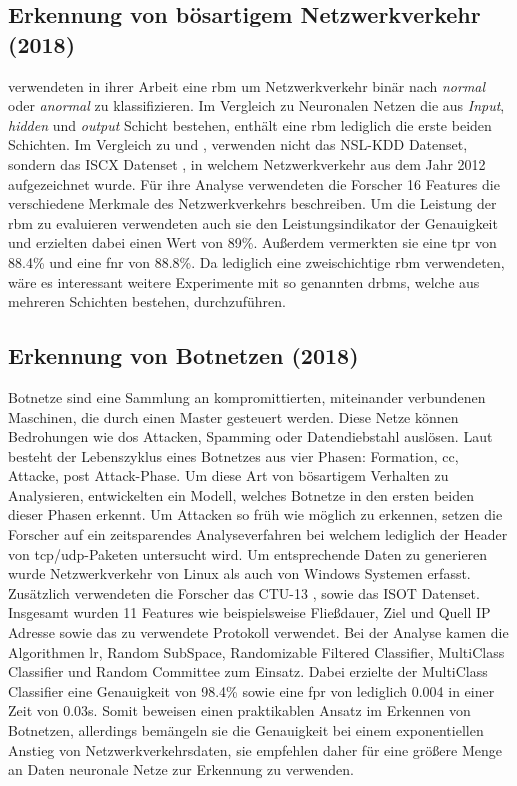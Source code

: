 \documentclass[
    12pt, %
    DIV10,
    ngerman, %
    a4paper, %
    oneside, %
    titlepage, %
    parskip=half, %
    headings=normal, %
    listof=totoc, %
    bibliography=totoc, %
    index=totoc, %
    captions=tableheading, %
    final %
]{scrreprt}
\begin{document}
\subsection{Erkennung von bösartigem Netzwerkverkehr (2018)}\label{iscx1}
\textcite{Aldwairi2018} verwendeten in ihrer Arbeit eine \ac{rbm} um Netzwerkverkehr binär nach \emph{normal} oder \emph{anormal} zu klassifizieren. Im Vergleich zu Neuronalen Netzen die aus \emph{Input}, \emph{hidden} und \emph{output} Schicht bestehen, enthält eine \ac{rbm} lediglich die erste beiden Schichten. Im Vergleich zu \textcite{Yin2017} und \textcite{Ding2018}, verwenden \textcite{Aldwairi2018} nicht das NSL-KDD Datenset, sondern das ISCX Datenset \parencite{shiravi2012toward}, in welchem Netzwerkverkehr aus dem Jahr 2012 aufgezeichnet wurde. Für ihre Analyse verwendeten die Forscher 16 Features die verschiedene Merkmale des Netzwerkverkehrs beschreiben.  Um die Leistung der \ac{rbm} zu evaluieren verwendeten auch sie den Leistungsindikator der Genauigkeit und erzielten dabei einen Wert von 89\%. Außerdem vermerkten sie eine \ac{tpr} von 88.4\% und eine \ac{fnr} von 88.8\%. Da \textcite{Aldwairi2018} lediglich eine zweischichtige \ac{rbm} verwendeten, wäre es interessant weitere Experimente mit so genannten \ac{drbms}, welche aus mehreren Schichten bestehen, durchzuführen.
%
\subsection{Erkennung von Botnetzen (2018)}\label{ctu}
Botnetze sind eine Sammlung an kompromittierten, miteinander verbundenen Maschinen, die durch einen Master gesteuert werden. Diese Netze können Bedrohungen wie \ac{dos} Attacken, Spamming oder Datendiebstahl auslösen. Laut \textcite{leonard2009framework} besteht der Lebenszyklus eines Botnetzes aus vier Phasen: Formation, \ac{cc}, Attacke, post Attack-Phase. Um diese Art von bösartigem Verhalten zu Analysieren, entwickelten \textcite{Mathur2018} ein Modell, welches Botnetze in den ersten beiden dieser Phasen erkennt. Um Attacken so früh wie möglich zu erkennen, setzen die Forscher auf ein zeitsparendes Analyseverfahren bei welchem lediglich der Header von \ac{tcp}/\ac{udp}-Paketen untersucht wird. Um entsprechende Daten zu generieren wurde Netzwerkverkehr von Linux als auch von Windows Systemen erfasst. Zusätzlich verwendeten die Forscher das CTU-13 \parencite{garcia2014empirical}, sowie das ISOT \parencite{isot} Datenset. Insgesamt wurden 11 Features wie beispielsweise Fließdauer, Ziel und Quell IP Adresse sowie das zu verwendete Protokoll verwendet. Bei der Analyse kamen die Algorithmen \ac{lr}, Random SubSpace, Randomizable Filtered Classifier, MultiClass Classifier und Random Committee zum Einsatz. Dabei erzielte der MultiClass Classifier eine Genauigkeit von 98.4\% sowie eine \ac{fpr} von lediglich 0.004 in einer Zeit von 0.03s. Somit beweisen \textcite{Mathur2018} einen praktikablen Ansatz im Erkennen von Botnetzen, allerdings bemängeln sie die Genauigkeit bei einem exponentiellen Anstieg von Netzwerkverkehrsdaten, sie empfehlen daher für eine größere Menge an Daten neuronale Netze zur Erkennung zu verwenden.
%
\end{document}
